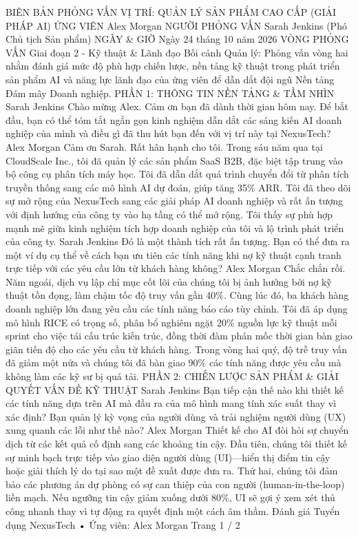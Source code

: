 \documentclass[12pt]{article}
\begin{document}
BIÊN BẢN PHỎNG VẤN
VỊ TRÍ: QUẢN LÝ SẢN PHẨM CAO CẤP (GIẢI PHÁP AI)
ỨNG VIÊN
Alex Morgan
NGƯỜI PHỎNG VẤN
Sarah Jenkins (Phó Chủ tịch Sản phẩm)
NGÀY \& GIỜ
Ngày 24 tháng 10 năm 2026
VÒNG PHỎNG VẤN
Giai đoạn 2 - Kỹ thuật \& Lãnh đạo
Bối cảnh Quản lý: Phỏng vấn vòng hai nhằm đánh giá mức độ phù hợp chiến lược, nền tảng kỹ thuật trong phát triển sản phẩm AI và năng lực lãnh đạo của ứng viên để dẫn dắt đội ngũ Nền tảng Đám mây Doanh nghiệp.
PHẦN 1: THÔNG TIN NỀN TẢNG \& TẦM NHÌN
Sarah Jenkins
Chào mừng Alex. Cảm ơn bạn đã dành thời gian hôm nay. Để bắt đầu, bạn có thể tóm tắt ngắn gọn kinh nghiệm dẫn dắt các sáng kiến AI doanh nghiệp của mình và điều gì đã thu hút bạn đến với vị trí này tại NexusTech?
Alex Morgan
Cảm ơn Sarah. Rất hân hạnh cho tôi. Trong sáu năm qua tại CloudScale Inc., tôi đã quản lý các sản phẩm SaaS B2B, đặc biệt tập trung vào bộ công cụ phân tích máy học. Tôi đã dẫn dắt quá trình chuyển đổi từ phân tích truyền thống sang các mô hình AI dự đoán, giúp tăng 35\% ARR. Tôi đã theo dõi sự mở rộng của NexusTech sang các giải pháp AI doanh nghiệp và rất ấn tượng với định hướng của công ty vào hạ tầng có thể mở rộng. Tôi thấy sự phù hợp mạnh mẽ giữa kinh nghiệm tích hợp doanh nghiệp của tôi và lộ trình phát triển của công ty.
Sarah Jenkins
Đó là một thành tích rất ấn tượng. Bạn có thể đưa ra một ví dụ cụ thể về cách bạn ưu tiên các tính năng khi nợ kỹ thuật cạnh tranh trực tiếp với các yêu cầu lớn từ khách hàng không?
Alex Morgan
Chắc chắn rồi. Năm ngoái, dịch vụ lập chỉ mục cốt lõi của chúng tôi bị ảnh hưởng bởi nợ kỹ thuật tồn đọng, làm chậm tốc độ truy vấn gần 40\%. Cùng lúc đó, ba khách hàng doanh nghiệp lớn đang yêu cầu các tính năng báo cáo tùy chỉnh. Tôi đã áp dụng mô hình RICE có trọng số, phân bổ nghiêm ngặt 20\% nguồn lực kỹ thuật mỗi sprint cho việc tái cấu trúc kiến trúc, đồng thời đàm phán mốc thời gian bàn giao giãn tiến độ cho các yêu cầu từ khách hàng. Trong vòng hai quý, độ trễ truy vấn đã giảm một nửa và chúng tôi đã bàn giao 90\% các tính năng được yêu cầu mà không làm các kỹ sư bị quá tải.
PHẦN 2: CHIẾN LƯỢC SẢN PHẨM \& GIẢI QUYẾT VẤN ĐỀ KỸ THUẬT
Sarah Jenkins
Bạn tiếp cận thế nào khi thiết kế các tính năng dựa trên AI mà đầu ra của mô hình mang tính xác suất thay vì xác định? Bạn quản lý kỳ vọng của người dùng và trải nghiệm người dùng (UX) xung quanh các lỗi như thế nào?
Alex Morgan
Thiết kế cho AI đòi hỏi sự chuyển dịch từ các kết quả cố định sang các khoảng tin cậy. Đầu tiên, chúng tôi thiết kế sự minh bạch trực tiếp vào giao diện người dùng (UI)—hiển thị điểm tin cậy hoặc giải thích lý do tại sao một đề xuất được đưa ra. Thứ hai, chúng tôi đảm bảo các phương án dự phòng có sự can thiệp của con người (human-in-the-loop) liền mạch. Nếu ngưỡng tin cậy giảm xuống dưới 80\%, UI sẽ gợi ý xem xét thủ công nhanh thay vì tự động ra quyết định một cách âm thầm.
Đánh giá Tuyển dụng NexusTech • Ứng viên: Alex Morgan
Trang 1 / 2
\end{document}
